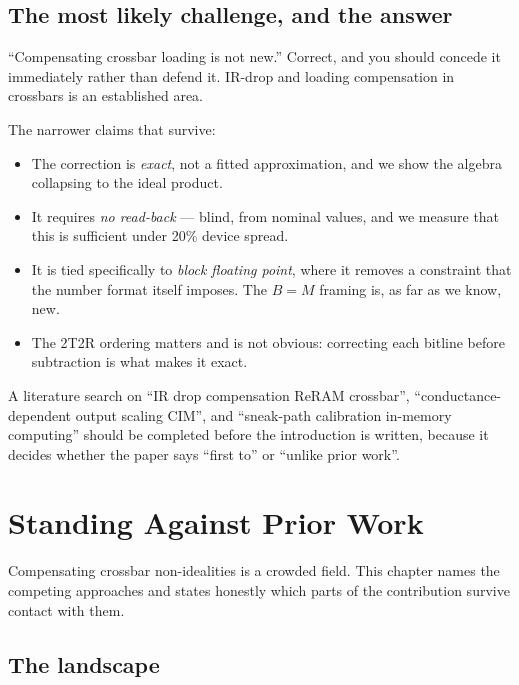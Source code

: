 \documentclass[11pt,a4paper]{report}
\begin{document}
\section{The most likely challenge, and the answer}

\begin{warnbox}{``Compensating crossbar loading is not new.''}
Correct, and you should concede it immediately rather than defend it.
IR-drop and loading compensation in crossbars is an established area.

The narrower claims that survive:
\begin{itemize}[leftmargin=1.3em]
  \item The correction is \emph{exact}, not a fitted approximation, and we
        show the algebra collapsing to the ideal product.
  \item It requires \emph{no read-back} --- blind, from nominal values, and we
        measure that this is sufficient under 20\% device spread.
  \item It is tied specifically to \emph{block floating point}, where it
        removes a constraint that the number format itself imposes. The
        $B = M$ framing is, as far as we know, new.
  \item The 2T2R ordering matters and is not obvious: correcting each bitline
        before subtraction is what makes it exact.
\end{itemize}

A literature search on ``IR drop compensation ReRAM crossbar'',
``conductance-dependent output scaling CIM'', and ``sneak-path calibration
in-memory computing'' should be completed before the introduction is written,
because it decides whether the paper says ``first to'' or ``unlike prior
work''.
\end{warnbox}


\chapter{Standing Against Prior Work}

Compensating crossbar non-idealities is a crowded field. This chapter names
the competing approaches and states honestly which parts of the contribution
survive contact with them.

\section{The landscape}
\end{document}
